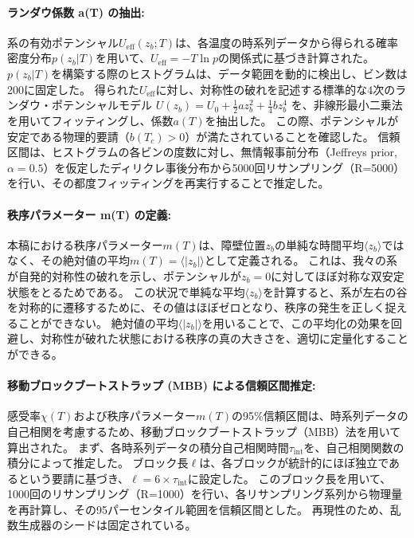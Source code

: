 \documentclass[a4paper,11pt,ja=standard,lualatex]{bxjsarticle}
\begin{document}
\paragraph{ランダウ係数 a(T) の抽出:}
系の有効ポテンシャル$U_{\mathrm{eff}}(z_b; T)$は、各温度の時系列データから得られる確率密度分布$p(z_b|T)$を用いて、$U_{\mathrm{eff}} = -T \ln p$の関係式に基づき計算された。
$p(z_b|T)$を構築する際のヒストグラムは、データ範囲を動的に検出し、ビン数は200に固定した。
得られた$U_{\mathrm{eff}}$に対し、対称性の破れを記述する標準的な4次のランダウ・ポテンシャルモデル $U(z_b) = U_0 + \frac{1}{2}a z_b^2 + \frac{1}{4}b z_b^4$ を、非線形最小二乗法を用いてフィッティングし、係数$a(T)$を抽出した。
この際、ポテンシャルが安定である物理的要請（$b(T_c) > 0$）が満たされていることを確認した。
信頼区間は、ヒストグラムの各ビンの度数に対し、無情報事前分布（Jeffreys prior, $\alpha=0.5$）を仮定したディリクレ事後分布から5000回リサンプリング（R=5000）を行い、その都度フィッティングを再実行することで推定した。

\paragraph{秩序パラメーター m(T) の定義:}
本稿における秩序パラメーター$m(T)$は、障壁位置$z_b$の単純な時間平均$\langle z_b \rangle$ではなく、その絶対値の平均$m(T) = \langle |z_b| \rangle$として定義される。
これは、我々の系が自発的対称性の破れを示し、ポテンシャルが$z_b=0$に対してほぼ対称な双安定状態をとるためである。
この状況で単純な平均$\langle z_b \rangle$を計算すると、系が左右の谷を対称的に遷移するために、その値はほぼゼロとなり、秩序の発生を正しく捉えることができない。
絶対値の平均$\langle |z_b| \rangle$を用いることで、この平均化の効果を回避し、対称性が破れた状態における秩序の真の大きさを、適切に定量化することができる。

\paragraph{移動ブロックブートストラップ (MBB) による信頼区間推定:}
感受率$\chi(T)$および秩序パラメーター$m(T)$の95\%信頼区間は、時系列データの自己相関を考慮するため、移動ブロックブートストラップ（MBB）法を用いて算出された。
まず、各時系列データの積分自己相関時間$\tau_{\mathrm{int}}$を、自己相関関数の積分によって推定した。
ブロック長$\ell$は、各ブロックが統計的にほぼ独立であるという要請に基づき、$\ell = 6 \times \tau_{\mathrm{int}}$に設定した。
このブロック長を用いて、1000回のリサンプリング（R=1000）を行い、各リサンプリング系列から物理量を再計算し、その95パーセンタイル範囲を信頼区間とした。
再現性のため、乱数生成器のシードは固定されている。
\end{document}
